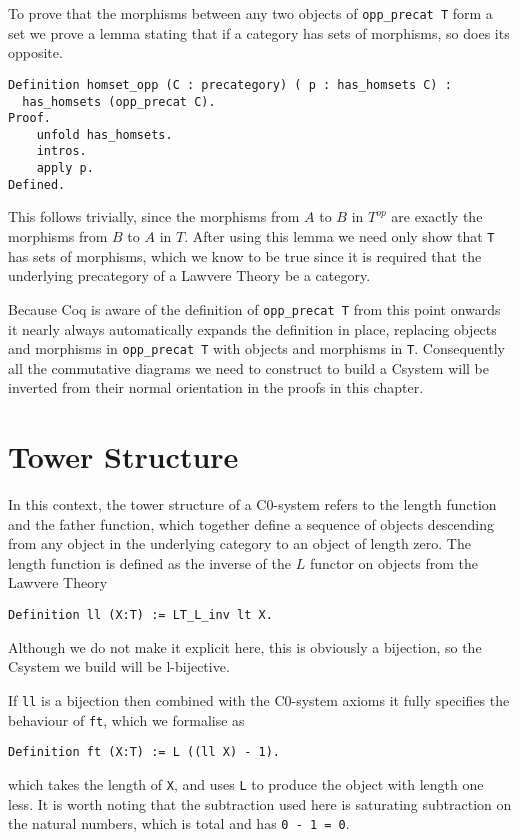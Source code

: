To prove that the morphisms between any two objects of \lstinline|opp_precat T|
form a set we prove a lemma stating that if a category has sets of morphisms, so
does its opposite.
\begin{lstlisting}
Definition homset_opp (C : precategory) ( p : has_homsets C) :
  has_homsets (opp_precat C).
Proof.
    unfold has_homsets.
    intros.
    apply p.
Defined.
\end{lstlisting}
This follows trivially, since the morphisms from $A$ to $B$ in $T^{op}$ are
exactly the morphisms from $B$ to $A$ in $T$. After using this lemma we need
only show that \lstinline|T| has sets of morphisms, which we know to be true since it
is required that the underlying precategory of a Lawvere Theory be a category.

Because Coq is aware of the definition of \lstinline|opp_precat T| from this point
onwards it nearly always automatically expands the definition in place,
replacing objects and morphisms in \lstinline|opp_precat T| with objects and
morphisms in \lstinline|T|. Consequently all the commutative diagrams we need to
construct to build a Csystem will be inverted from their normal orientation in
the proofs in this chapter.

\section{Tower Structure}
In this context, the tower structure of a C0-system refers to the length
function and the father function, which together define a sequence of objects
descending from any object in the underlying category to an object of length
zero. The length function is defined as the inverse of the $L$ functor on
objects from the Lawvere Theory
\begin{lstlisting}
Definition ll (X:T) := LT_L_inv lt X.
\end{lstlisting}

Although we do not make it explicit here, this is obviously a bijection, so the
Csystem we build will be l-bijective.

If \lstinline|ll| is a bijection then combined with the C0-system axioms it fully
specifies the behaviour of \lstinline|ft|, which we formalise as
\begin{lstlisting}
Definition ft (X:T) := L ((ll X) - 1).
\end{lstlisting}
which takes the length of \lstinline|X|, and uses \lstinline|L| to produce the object with
length one less. It is worth noting that the subtraction used here is saturating
subtraction on the natural numbers, which is total and has \lstinline|0 - 1 = 0|.

